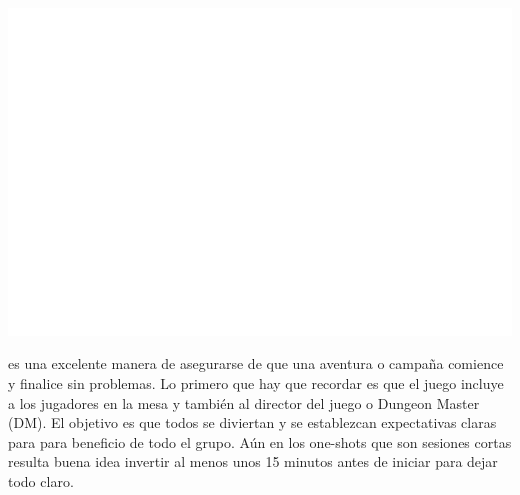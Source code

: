 \documentclass[10pt,twoside,twocolumn,openany]{dndbook}
\begin{document}

\begin{strip}
  \centering
  \includegraphics[width=\textwidth]{media/invisible.png}
\end{strip}

 es una excelente manera de asegurarse de que una aventura o
campaña comience y finalice sin problemas. Lo primero que hay que recordar es que el juego incluye 
a los jugadores en la mesa y también al director del juego o Dungeon Master (DM). El objetivo es 
que todos se diviertan y se establezcan expectativas claras para para beneficio de todo el grupo. 
Aún en los one-shots que son sesiones cortas resulta buena idea invertir al menos unos 15 
minutos antes de iniciar para dejar todo claro.
\end{document}
